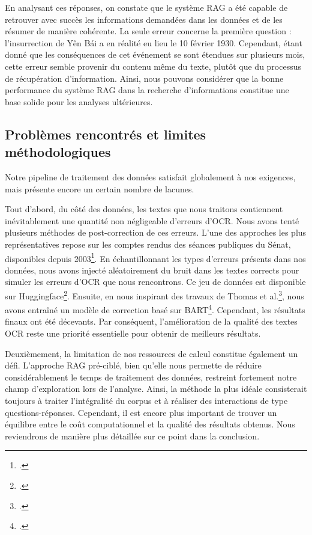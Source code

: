 \documentclass[a4paper,twoside,12pt]{book}
\begin{document}
En analysant ces réponses, on constate que le système RAG a été capable de retrouver avec succès les informations demandées dans les données et de les résumer de manière cohérente. La seule erreur concerne la première question : l'insurrection de Yên Bái a en réalité eu lieu le 10 février 1930. Cependant, étant donné que les conséquences de cet événement se sont étendues sur plusieurs mois, cette erreur semble provenir du contenu même du texte, plutôt que du processus de récupération d'information. Ainsi, nous pouvons considérer que la bonne performance du système RAG dans la recherche d'informations constitue une base solide pour les analyses ultérieures.

\subsection{Problèmes rencontrés et limites méthodologiques}

Notre pipeline de traitement des données satisfait globalement à nos exigences, mais présente encore un certain nombre de lacunes.

Tout d'abord, du côté des données, les textes que nous traitons contiennent inévitablement une quantité non négligeable d'erreurs d'OCR. Nous avons tenté plusieurs méthodes de post-correction de ces erreurs. L'une des approches les plus représentatives repose sur les comptes rendus des séances publiques du Sénat, disponibles depuis 2003\footcite{zotero-758}. En échantillonnant les types d'erreurs présents dans nos données, nous avons injecté aléatoirement du bruit dans les textes corrects pour simuler les erreurs d'OCR que nous rencontrons. Ce jeu de données est disponible sur Huggingface\footcite{2025b}. Ensuite, en nous inspirant des travaux de Thomas et al.\footcite{thomas2024}, nous avons entraîné un modèle de correction basé sur BART\footcite{2025c}. Cependant, les résultats finaux ont été décevants. Par conséquent, l'amélioration de la qualité des textes OCR reste une priorité essentielle pour obtenir de meilleurs résultats.

Deuxièmement, la limitation de nos ressources de calcul constitue également un défi. L'approche RAG pré-ciblé, bien qu'elle nous permette de réduire considérablement le temps de traitement des données, restreint fortement notre champ d'exploration lors de l'analyse. Ainsi, la méthode la plus idéale consisterait toujours à traiter l'intégralité du corpus et à réaliser des interactions de type questions-réponses. Cependant, il est encore plus important de trouver un équilibre entre le coût computationnel et la qualité des résultats obtenus. Nous reviendrons de manière plus détaillée sur ce point dans la conclusion.
\end{document}
